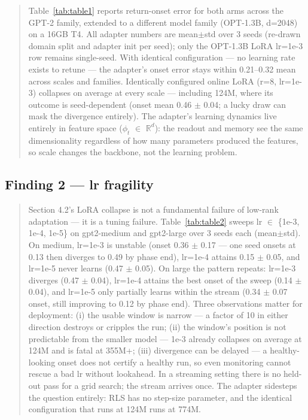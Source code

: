 \documentclass[11pt]{article}
\begin{document}
\begin{quote}
Table~\ref{tab:table1} reports return-onset error for both arms across the GPT-2 family, extended to a different model family (OPT-1.3B, d=2048) on a 16GB T4. All adapter numbers are mean\(\pm\)std over 3 seeds (re-drawn domain split and adapter init per seed); only the OPT-1.3B LoRA lr=1e-3 row remains single-seed. With identical configuration --- no learning rate exists to retune --- the adapter's onset error stays within 0.21--0.32 mean across scales and families. Identically configured online LoRA (r=8, lr=1e-3) collapses on average at every scale --- including 124M, where its outcome is seed-dependent (onset mean 0.46 \(\pm\) 0.04; a lucky draw can mask the divergence entirely). The adapter's learning dynamics live entirely in feature space (\(\phi_t\) \(\in\) \(\mathbb{R}^d\)): the readout and memory see the same dimensionality regardless of how many parameters produced the features, so scale changes the backbone, not the learning problem.
\end{quote}

\begin{table}[t]
\centering\small

\caption{Return-onset error across scales and families (mean$\pm$std, 3 seeds; only OPT-1.3B LoRA is single-seed). Identical configuration throughout; the adapter has no lr to retune.}
\label{tab:table1}
\end{table}

\subsection{Finding 2 --- lr fragility}\label{finding-2-lr-fragility}

\begin{quote}
Section 4.2's LoRA collapse is not a fundamental failure of low-rank adaptation --- it is a tuning failure. Table~\ref{tab:table2} sweeps lr \(\in\) \{1e-3, 1e-4, 1e-5\} on gpt2-medium and gpt2-large over 3 seeds each (mean\(\pm\)std). On medium, lr=1e-3 is unstable (onset 0.36 \(\pm\) 0.17 --- one seed onsets at 0.13 then diverges to 0.49 by phase end), lr=1e-4 attains 0.15 \(\pm\) 0.05, and lr=1e-5 never learns (0.47 \(\pm\) 0.05). On large the pattern repeats: lr=1e-3 diverges (0.47 \(\pm\) 0.04), lr=1e-4 attains the best onset of the sweep (0.14 \(\pm\) 0.04), and lr=1e-5 only partially learns within the stream (0.34 \(\pm\) 0.07 onset, still improving to 0.12 by phase end). Three observations matter for deployment: (i) the usable window is narrow --- a factor of 10 in either direction destroys or cripples the run; (ii) the window's position is not predictable from the smaller model --- 1e-3 already collapses on average at 124M and is fatal at 355M+; (iii) divergence can be delayed --- a healthy-looking onset does not certify a healthy run, so even monitoring cannot rescue a bad lr without lookahead. In a streaming setting there is no held-out pass for a grid search; the stream arrives once. The adapter sidesteps the question entirely: RLS has no step-size parameter, and the identical configuration that runs at 124M runs at 774M.
\end{quote}
\end{document}
